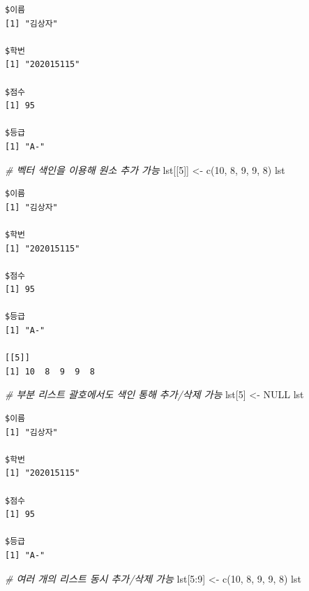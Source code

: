 \documentclass[
  11pt,
]{krantz}
\newenvironment{Shaded}{\begin{snugshade}}{\end{snugshade}}
\newcommand{\CommentTok}[1]{\textcolor[rgb]{0.37,0.37,0.37}{\textit{#1}}}
\newcommand{\ConstantTok}[1]{\textcolor[rgb]{0,0,0}{#1}}
\newcommand{\DecValTok}[1]{\textcolor[rgb]{0.06,0.06,0.06}{#1}}
\newcommand{\FunctionTok}[1]{\textcolor[rgb]{0,0,0}{#1}}
\newcommand{\NormalTok}[1]{#1}
\newcommand{\OtherTok}[1]{\textcolor[rgb]{0.37,0.37,0.37}{#1}}
\newcommand{\SpecialCharTok}[1]{\textcolor[rgb]{0,0,0}{#1}}
\begin{document}
\begin{verbatim}
$이름
[1] "김상자"

$학번
[1] "202015115"

$점수
[1] 95

$등급
[1] "A-"
\end{verbatim}

\begin{Shaded}
\begin{Highlighting}[]
\CommentTok{\# 벡터 색인을 이용해 원소 추가 가능}
\NormalTok{lst[[}\DecValTok{5}\NormalTok{]] }\OtherTok{\textless{}{-}} \FunctionTok{c}\NormalTok{(}\DecValTok{10}\NormalTok{, }\DecValTok{8}\NormalTok{, }\DecValTok{9}\NormalTok{, }\DecValTok{9}\NormalTok{, }\DecValTok{8}\NormalTok{)}
\NormalTok{lst}
\end{Highlighting}
\end{Shaded}

\begin{verbatim}
$이름
[1] "김상자"

$학번
[1] "202015115"

$점수
[1] 95

$등급
[1] "A-"

[[5]]
[1] 10  8  9  9  8
\end{verbatim}

\begin{Shaded}
\begin{Highlighting}[]
\CommentTok{\# 부분 리스트 괄호에서도 색인 통해 추가/삭제 가능}
\NormalTok{lst[}\DecValTok{5}\NormalTok{] }\OtherTok{\textless{}{-}} \ConstantTok{NULL}
\NormalTok{lst}
\end{Highlighting}
\end{Shaded}

\begin{verbatim}
$이름
[1] "김상자"

$학번
[1] "202015115"

$점수
[1] 95

$등급
[1] "A-"
\end{verbatim}

\begin{Shaded}
\begin{Highlighting}[]
\CommentTok{\# 여러 개의 리스트 동시 추가/삭제 가능}
\NormalTok{lst[}\DecValTok{5}\SpecialCharTok{:}\DecValTok{9}\NormalTok{] }\OtherTok{\textless{}{-}}  \FunctionTok{c}\NormalTok{(}\DecValTok{10}\NormalTok{, }\DecValTok{8}\NormalTok{, }\DecValTok{9}\NormalTok{, }\DecValTok{9}\NormalTok{, }\DecValTok{8}\NormalTok{)}
\NormalTok{lst}
\end{Highlighting}
\end{Shaded}
\end{document}
